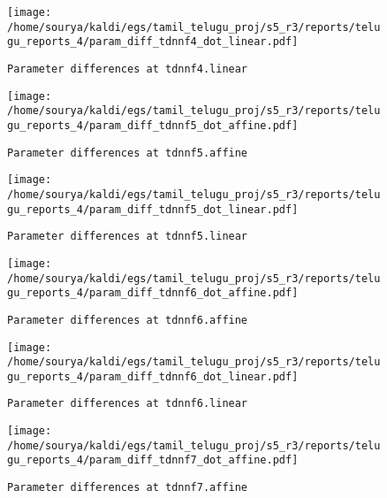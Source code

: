 \documentclass[prl,10pt,twocolumn]{revtex4}
\begin{document}
\newpage
\begin{figure}[h]
  \begin{center}
    \caption{\texttt{Parameter differences at tdnnf4.linear}}
    \texttt{[image: /home/sourya/kaldi/egs/tamil\_telugu\_proj/s5\_r3/reports/telugu\_reports\_4/param\_diff\_tdnnf4\_dot\_linear.pdf]}
  \end{center}
\end{figure}
\clearpage


\newpage
\begin{figure}[h]
  \begin{center}
    \caption{\texttt{Parameter differences at tdnnf5.affine}}
    \texttt{[image: /home/sourya/kaldi/egs/tamil\_telugu\_proj/s5\_r3/reports/telugu\_reports\_4/param\_diff\_tdnnf5\_dot\_affine.pdf]}
  \end{center}
\end{figure}
\clearpage


\newpage
\begin{figure}[h]
  \begin{center}
    \caption{\texttt{Parameter differences at tdnnf5.linear}}
    \texttt{[image: /home/sourya/kaldi/egs/tamil\_telugu\_proj/s5\_r3/reports/telugu\_reports\_4/param\_diff\_tdnnf5\_dot\_linear.pdf]}
  \end{center}
\end{figure}
\clearpage


\newpage
\begin{figure}[h]
  \begin{center}
    \caption{\texttt{Parameter differences at tdnnf6.affine}}
    \texttt{[image: /home/sourya/kaldi/egs/tamil\_telugu\_proj/s5\_r3/reports/telugu\_reports\_4/param\_diff\_tdnnf6\_dot\_affine.pdf]}
  \end{center}
\end{figure}
\clearpage


\newpage
\begin{figure}[h]
  \begin{center}
    \caption{\texttt{Parameter differences at tdnnf6.linear}}
    \texttt{[image: /home/sourya/kaldi/egs/tamil\_telugu\_proj/s5\_r3/reports/telugu\_reports\_4/param\_diff\_tdnnf6\_dot\_linear.pdf]}
  \end{center}
\end{figure}
\clearpage


\newpage
\begin{figure}[h]
  \begin{center}
    \caption{\texttt{Parameter differences at tdnnf7.affine}}
    \texttt{[image: /home/sourya/kaldi/egs/tamil\_telugu\_proj/s5\_r3/reports/telugu\_reports\_4/param\_diff\_tdnnf7\_dot\_affine.pdf]}
  \end{center}
\end{figure}
\clearpage
\end{document}
